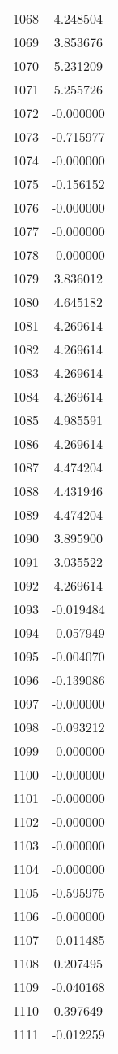 \documentclass[12pt]{article}
\begin{document}
\begin{longtable}{@{}cc@{}}
1068 & 4.248504 \\
1069 & 3.853676 \\
1070 & 5.231209 \\
1071 & 5.255726 \\
1072 & -0.000000 \\
1073 & -0.715977 \\
1074 & -0.000000 \\
1075 & -0.156152 \\
1076 & -0.000000 \\
1077 & -0.000000 \\
1078 & -0.000000 \\
1079 & 3.836012 \\
1080 & 4.645182 \\
1081 & 4.269614 \\
1082 & 4.269614 \\
1083 & 4.269614 \\
1084 & 4.269614 \\
1085 & 4.985591 \\
1086 & 4.269614 \\
1087 & 4.474204 \\
1088 & 4.431946 \\
1089 & 4.474204 \\
1090 & 3.895900 \\
1091 & 3.035522 \\
1092 & 4.269614 \\
1093 & -0.019484 \\
1094 & -0.057949 \\
1095 & -0.004070 \\
1096 & -0.139086 \\
1097 & -0.000000 \\
1098 & -0.093212 \\
1099 & -0.000000 \\
1100 & -0.000000 \\
1101 & -0.000000 \\
1102 & -0.000000 \\
1103 & -0.000000 \\
1104 & -0.000000 \\
1105 & -0.595975 \\
1106 & -0.000000 \\
1107 & -0.011485 \\
1108 & 0.207495 \\
1109 & -0.040168 \\
1110 & 0.397649 \\
1111 & -0.012259 \\

\end{longtable}
\end{document}
